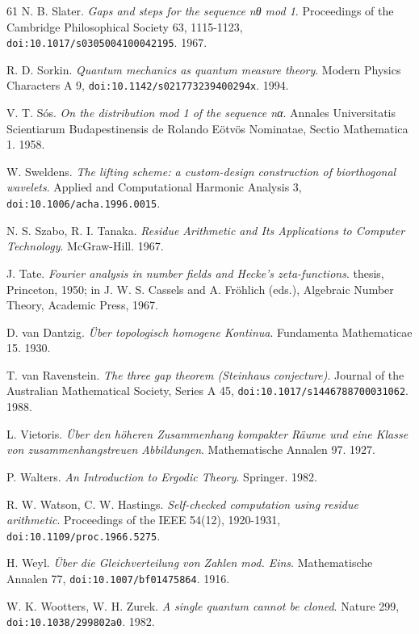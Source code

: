 \begin{thebibliography}{61}
N. B. Slater. \emph{Gaps and steps for the sequence nθ mod 1}. Proceedings of the Cambridge Philosophical Society 63, 1115-1123, \texttt{doi:10.1017/\allowbreak{}s0305004100042195}. 1967.

R. D. Sorkin. \emph{Quantum mechanics as quantum measure theory}. Modern Physics Characters A 9, \texttt{doi:10.1142/\allowbreak{}s021773239400294x}. 1994.

V. T. Sós. \emph{On the distribution mod 1 of the sequence nα}. Annales Universitatis Scientiarum Budapestinensis de Rolando Eötvös Nominatae, Sectio Mathematica 1. 1958.

W. Sweldens. \emph{The lifting scheme: a custom-design construction of biorthogonal wavelets}. Applied and Computational Harmonic Analysis 3, \texttt{doi:10.1006/\allowbreak{}acha.1996.0015}.

N. S. Szabo, R. I. Tanaka. \emph{Residue Arithmetic and Its Applications to Computer Technology}. McGraw-Hill. 1967.

J. Tate. \emph{Fourier analysis in number fields and Hecke's zeta-functions}. thesis, Princeton, 1950; in J. W. S. Cassels and A. Fröhlich (eds.), Algebraic Number Theory, Academic Press, 1967.

D. van Dantzig. \emph{Über topologisch homogene Kontinua}. Fundamenta Mathematicae 15. 1930.

T. van Ravenstein. \emph{The three gap theorem (Steinhaus conjecture)}. Journal of the Australian Mathematical Society, Series A 45, \texttt{doi:10.1017/\allowbreak{}s1446788700031062}. 1988.

L. Vietoris. \emph{Über den höheren Zusammenhang kompakter Räume und eine Klasse von zusammenhangstreuen Abbildungen}. Mathematische Annalen 97. 1927.

P. Walters. \emph{An Introduction to Ergodic Theory}. Springer. 1982.

R. W. Watson, C. W. Hastings. \emph{Self-checked computation using residue arithmetic}. Proceedings of the IEEE 54(12), 1920-1931, \texttt{doi:10.1109/\allowbreak{}proc.1966.5275}.

H. Weyl. \emph{Über die Gleichverteilung von Zahlen mod. Eins}. Mathematische Annalen 77, \texttt{doi:10.1007/\allowbreak{}bf01475864}. 1916.

W. K. Wootters, W. H. Zurek. \emph{A single quantum cannot be cloned}. Nature 299, \texttt{doi:10.1038/\allowbreak{}299802a0}. 1982.

\end{thebibliography}
